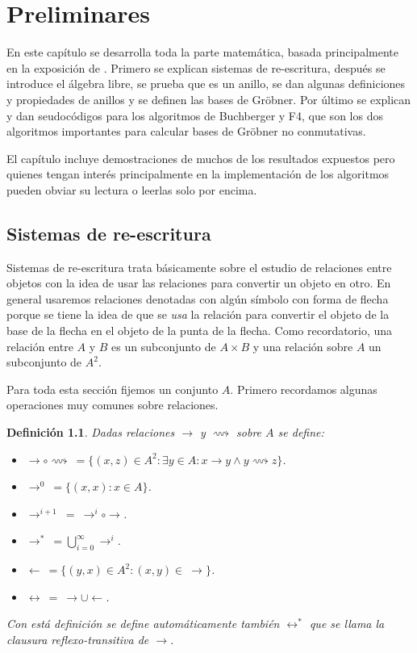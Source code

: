 \documentclass[12pt]{report}
\theoremstyle{customstyle}
\newtheorem{definition}[theorem]{Definición}
\theoremstyle{factstyle}
\begin{document}
\chapter{Preliminares}\label{cap:Preliminares}

En este capítulo se desarrolla toda la parte matemática, basada principalmente en la exposición de \cite{thesis:Hof20}. Primero se explican sistemas de re-escritura, después se introduce el álgebra libre, se prueba que es un anillo, se dan algunas definiciones y propiedades de anillos y se definen las bases de Gröbner. Por último se explican y dan seudocódigos para los algoritmos de Buchberger y F4, que son los dos algoritmos importantes para calcular bases de Gröbner no conmutativas.

El capítulo incluye demostraciones de muchos de los resultados expuestos pero quienes tengan interés principalmente en la implementación de los algoritmos pueden obviar su lectura o leerlas solo por encima.

\section{Sistemas de re-escritura}

Sistemas de re-escritura trata básicamente sobre el estudio de relaciones entre objetos con la idea de usar las relaciones para convertir un objeto en otro. En general usaremos relaciones denotadas con algún símbolo con forma de flecha porque se tiene la idea de que se \textsl{usa} la relación para convertir el objeto de la base de la flecha en el objeto de la punta de la flecha. Como recordatorio, una relación entre $A$ y $B$ es un subconjunto de $A × B$ y una relación sobre $A$ un subconjunto de $A^2$.

Para toda esta sección fijemos un conjunto $A$. Primero recordamos algunas operaciones muy comunes sobre relaciones.

\begin{definition}\label{def:operaciones relaciones}
  Dadas relaciones $→$ y $⟿$ sobre $A$ se define:
  \begin{itemize}
    \item $→ ∘ ⟿\ = \{(x, z) ∈ A^2 : ∃y ∈ A : x → y ∧ y ⟿ z\}$.
    \item $→^0\ = \{(x, x) : x ∈ A\}$.
    \item $→^{i + 1}\ =\ →^i ∘ →$.
    \item $→^*\ = ⋃_{i = 0}^∞ →^i$.
    \item $←\ = \{(y, x) ∈ A^2 : (x, y) ∈\ →\}$.
    \item $↔\ =\ → ∪ ←$.
  \end{itemize}

  Con está definición se define automáticamente también $↔^*$ que se llama la clausura reflexo-transitiva de $→$.
\end{definition}
\end{document}
